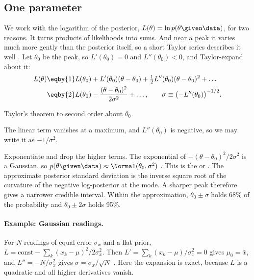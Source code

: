 \subsection{One parameter}

We work with the logarithm of the posterior, $L(\theta)=\ln p(\theta\given\data)$, for
two reasons. It turns products of likelihoods into sums. And near a peak it varies much
more gently than the posterior itself, so a short Taylor series describes it well
. Let $\theta_0$ be the peak, so $L'(\theta_0)=0$ and
$L''(\theta_0)<0$, and Taylor-expand about it:
\begin{align}
  L(\theta)
  &\eqby{1}L(\theta_0)+L'(\theta_0)(\theta-\theta_0)
     +\tfrac12L''(\theta_0)(\theta-\theta_0)^2+\dots
   \nonumber\\
  &\eqby{2}L(\theta_0)-\frac{(\theta-\theta_0)^2}{2\sigma^2}+\dots,
   \qquad \sigma\equiv\bigl(-L''(\theta_0)\bigr)^{-1/2}.
  \label{5b:eq:laplace}
\end{align}
\begin{explain}
  \item Taylor's theorem to second order about $\theta_0$.
  \item The linear term vanishes at a maximum, and $L''(\theta_0)$ is negative, so we
        may write it as $-1/\sigma^2$.
\end{explain}
Exponentiate and drop the higher terms. The exponential of $-(\theta-\theta_0)^2/
2\sigma^2$ is a Gaussian, so $p(\theta\given\data)\approx\Normal(\theta_0,\sigma^2)$
. This is the  or . The approximate posterior standard deviation is the inverse square root of
the curvature of the negative log-posterior at the mode. A sharper peak
therefore gives a narrower credible interval. Within the approximation, $\theta_0\pm\sigma$ holds 68\% of
the probability and $\theta_0\pm2\sigma$ holds 95\%.

\paragraph{Example: Gaussian readings.}
For $N$ readings of equal error $\sigma_x$ and a flat prior, $L=\text{const}-\sum_k(x_k-
\mu)^2/2\sigma_x^2$. Then $L'=\sum_k(x_k-\mu)/\sigma_x^2=0$ gives $\mu_0=\bar x$, and
$L''=-N/\sigma_x^2$ gives $\sigma=\sigma_x/\sqrt N$ . Here
the expansion is exact, because $L$ is a quadratic and all higher derivatives vanish.

